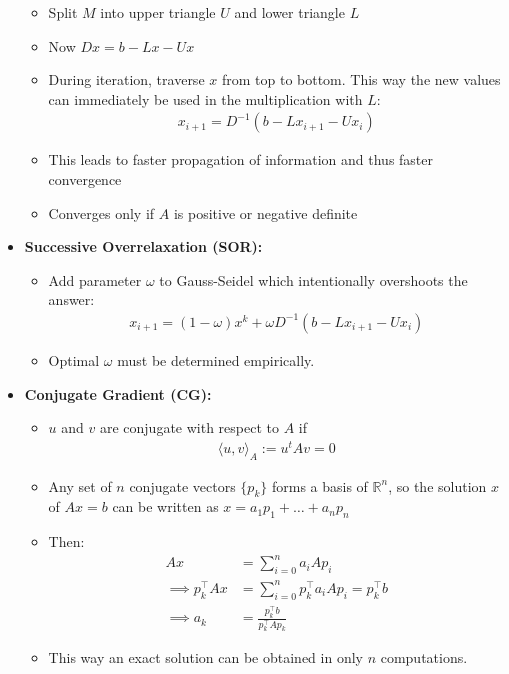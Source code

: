 \documentclass{scrartcl}
\begin{document}
\begin{itemize}
\begin{itemize}
        \item Split $M$ into upper triangle $U$ and lower triangle $L$
        \item Now $Dx = b - Lx - Ux$
        \item During iteration, traverse $x$ from top to bottom. This way the new values can immediately be used in the multiplication with $L$:
        \begin{align*}
            x_{i+1} = D^{-1}(b - Lx_{i+1} - Ux_i)
        \end{align*}
        \item This leads to faster propagation of information and thus faster convergence
        \item Converges only if $A$ is positive or negative definite
    \end{itemize}
    \item \textbf{Successive Overrelaxation (SOR):}
    \begin{itemize}
        \item Add parameter $\omega$ to Gauss-Seidel which intentionally overshoots the answer:
        \begin{align*}
            x_{i+1} = (1-\omega)x^k + \omega D^{-1}(b - Lx_{i+1} - Ux_i)
        \end{align*}
        \item Optimal $\omega$ must be determined empirically.
    \end{itemize}
    \item \textbf{Conjugate Gradient (CG):}
    \begin{itemize}
        \item $u$ and $v$ are conjugate with respect to $A$ if 
        \begin{align*}
            \langle u,v \rangle_A := u^t A v = 0 
        \end{align*}
        \item Any set of $n$ conjugate vectors $\{p_k\}$ forms a basis of $\mathbb{R}^n$, so the solution $x$ of $Ax = b$ can be written as $x = a_1p_1 + \hdots + a_np_n$
        \item Then:
        \begin{align*}
            Ax &= \sum_{i=0}^n a_i A p_i\\
            \implies p_k^\top Ax &= \sum_{i=0}^n p_k^\top a_i A p_i = p_k^\top b\\
            \implies a_k &= \frac{p_k^\top b}{p_k^\top A p_k}
        \end{align*}
        \item This way an exact solution can be obtained in only $n$ computations.

\end{itemize}
\end{itemize}
\end{document}
